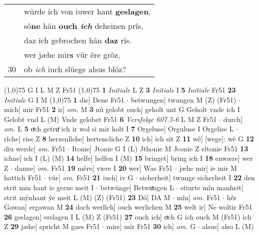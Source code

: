 \documentclass[8pt,a4paper,notitlepage]{article}
\begin{document}
\begin{table}[ht]
\begin{minipage}[t]{0.5\linewidth}
\begin{tabular}{rl}
 & würde ich von iuwer hant \textbf{geslagen},\\ 
 & sô\textbf{ne} hân \textbf{ouch \textit{ich}} deheinen prîs,\\ 
 & daz ich gebrochen hân \textbf{daz} rîs.\\ 
 & wer jæhe mir\textbf{s} vür êre grôz,\\ 
30 & ob \textit{ich} iuch slüege alsus blôz?\\ 
\end{tabular}
\scriptsize
\line(1,0){75} \newline
G I L M Z Fr51 \newline
\line(1,0){75} \newline
\textbf{1} \textit{Initiale} L Z  \textbf{3} \textit{Initiale} I  \textbf{5} \textit{Initiale} Fr51  \textbf{23} \textit{Initiale} G I M  \newline
\line(1,0){75} \newline
\textbf{1} die] Dene Fr51  $\cdot$ betwungen] twungen M (Z) (Fr51)  $\cdot$ mich] mir Fr51 \textbf{2} ir] \textit{om.} M \textbf{3} nû gelobt ouch] geholt unt G Geholt vnde ich I Gelobt vnd L (M) Vnde gelobet Fr51 \textbf{6} \textit{Versfolge 607.5-6} L M Z Fr51   $\cdot$ durch] \textit{om.} L \textbf{5} oͮch getruͤ ich ir wol si mir holt I \textbf{7} Orgeluse] Orguluse I Orgelise L  $\cdot$ rîche] rise Z \textbf{8} herzenlîche] hertencliche Z \textbf{10} ich] ich sit Z \textbf{11} wê] [wege]: wê G \textbf{12} diu werde] \textit{om.} Fr51  $\cdot$ Itonie] Jtonie G I (L) Jthonie M Jconie Z eltonie Fr51 \textbf{13} ichne] ich I (L) (M) \textbf{14} helfe] helfen I (M) \textbf{15} bringet] bring ich I \textbf{18} enwære] wer Z  $\cdot$ danne] \textit{om.} Fr51 \textbf{19} mêre] viere I \textbf{20} wer] Was Fr51  $\cdot$ jæhe mir] ie mir M hattich Fr51  $\cdot$ vür] \textit{om.} Fr51 \textbf{21} iuch] iv G  $\cdot$ sicherheit] twunge sicherheit I \textbf{22} den strit min hant ie gerne meit I  $\cdot$ betwünge] Betwuͯngen L  $\cdot$ stiurte mîn manheit] strit mýnhant ýe meit L (M) (Z) (Fr51) \textbf{23} Dô] DA M  $\cdot$ mîn] \textit{om.} Fr51  $\cdot$ hêr Gawan] ergawan M \textbf{24} doch werlîch] ouch werlichen M \textbf{25} welt ir] Ne woltir Fr51 \textbf{26} geslagen] erslagen I L (M) Z (Fr51) \textbf{27} ouch ich] oͮch G ich ouch M (Fr51) ich Z \textbf{29} jæhe] spricht M gaes Fr51  $\cdot$ mirs] mir Fr51 \textbf{30} ich] \textit{om.} G  $\cdot$ alsus] also L (M) \newline
\end{minipage}
\hspace{0.5cm}

\end{table}
\end{document}
